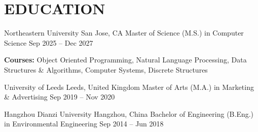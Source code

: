 \vspace{3pt}
\section{EDUCATION}

\resumeSubheading
    {Northeastern University}
    {San Jose, CA}
    {Master of Science (M.S.) in Computer Science}
    {Sep 2025 -- Dec 2027}

\vspace{-1pt}

{\footnotesize
\textbf{Courses:} Object Oriented Programming, Natural Language Processing, Data Structures \& Algorithms, Computer Systems, Discrete Structures
}

\vspace{1pt}

\resumeSubheading
    {University of Leeds}
    {Leeds, United Kingdom}
    {Master of Arts (M.A.) in Marketing \& Advertising}
    {Sep 2019 -- Nov 2020}

\vspace{1pt}

\resumeSubheading
    {Hangzhou Dianzi University}
    {Hangzhou, China}
    {Bachelor of Engineering (B.Eng.) in Environmental Engineering}
    {Sep 2014 -- Jun 2018}

\vspace{-4pt}
